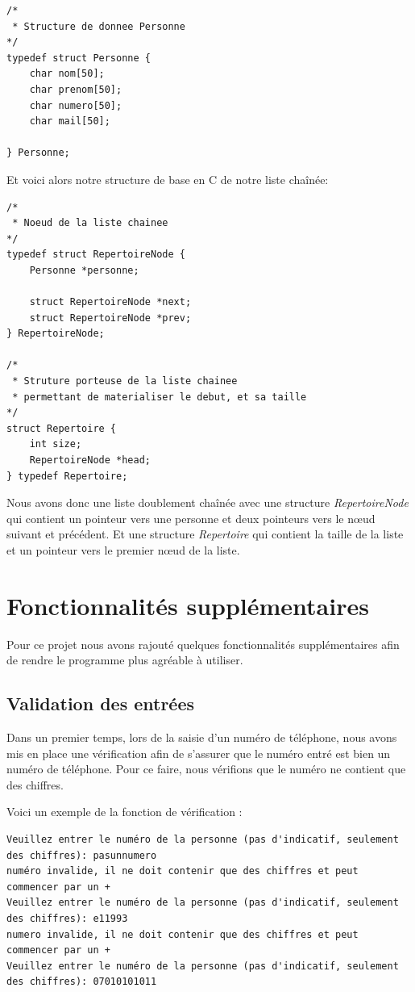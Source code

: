 \documentclass[12pt]{report}
\begin{document}
\begin{verbatim}
/*
 * Structure de donnee Personne
*/
typedef struct Personne {
    char nom[50];
    char prenom[50];
    char numero[50];
    char mail[50];

} Personne;
\end{verbatim}


Et voici alors notre structure de base en C de notre liste chaînée:
\begin{verbatim}
/*
 * Noeud de la liste chainee
*/
typedef struct RepertoireNode {
    Personne *personne;

    struct RepertoireNode *next;
    struct RepertoireNode *prev;
} RepertoireNode;

/*
 * Struture porteuse de la liste chainee
 * permettant de materialiser le debut, et sa taille
*/
struct Repertoire {
    int size;
    RepertoireNode *head;
} typedef Repertoire;
\end{verbatim}

Nous avons donc une liste doublement chaînée avec une structure \textit{RepertoireNode} qui contient un pointeur vers une personne et deux pointeurs vers le nœud suivant et précédent. Et une structure \textit{Repertoire} qui contient la taille de la liste et un pointeur vers le premier nœud de la liste.

\chapter{Fonctionnalités supplémentaires}
Pour ce projet nous avons rajouté quelques fonctionnalités supplémentaires afin de rendre le programme plus agréable à utiliser.
\section{Validation des entrées}
Dans un premier temps, lors de la saisie d’un numéro de téléphone, nous avons mis en place une vérification afin de s’assurer que le numéro entré est bien un numéro de téléphone. Pour ce faire, nous vérifions que le numéro ne contient que des chiffres.

Voici un exemple de la fonction de vérification :
\begin{verbatim}
Veuillez entrer le numéro de la personne (pas d'indicatif, seulement des chiffres): pasunnumero
numéro invalide, il ne doit contenir que des chiffres et peut commencer par un +
Veuillez entrer le numéro de la personne (pas d'indicatif, seulement des chiffres): e11993
numero invalide, il ne doit contenir que des chiffres et peut commencer par un +
Veuillez entrer le numéro de la personne (pas d'indicatif, seulement des chiffres): 07010101011
\end{verbatim}
\end{document}

